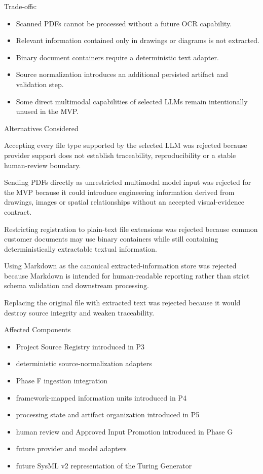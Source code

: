 Trade-offs:

\begin{itemize}
\tightlist
\item
  Scanned PDFs cannot be processed without a future OCR capability.
\item
  Relevant information contained only in drawings or diagrams is not extracted.
\item
  Binary document containers require a deterministic text adapter.
\item
  Source normalization introduces an additional persisted artifact and validation step.
\item
  Some direct multimodal capabilities of selected LLMs remain intentionally unused in the MVP.
\end{itemize}

Alternatives Considered

Accepting every file type supported by the selected LLM was rejected because provider support does not establish traceability, reproducibility or a stable human-review boundary.

Sending PDFs directly as unrestricted multimodal model input was rejected for the MVP because it could introduce engineering information derived from drawings, images or spatial relationships without an accepted visual-evidence contract.

Restricting registration to plain-text file extensions was rejected because common customer documents may use binary containers while still containing deterministically extractable textual information.

Using Markdown as the canonical extracted-information store was rejected because Markdown is intended for human-readable reporting rather than strict schema validation and downstream processing.

Replacing the original file with extracted text was rejected because it would destroy source integrity and weaken traceability.

Affected Components

\begin{itemize}
\tightlist
\item
  Project Source Registry introduced in P3
\item
  deterministic source-normalization adapters
\item
  Phase F ingestion integration
\item
  framework-mapped information units introduced in P4
\item
  processing state and artifact organization introduced in P5
\item
  human review and Approved Input Promotion introduced in Phase G
\item
  future provider and model adapters
\item
  future SysML v2 representation of the Turing Generator
\end{itemize}

